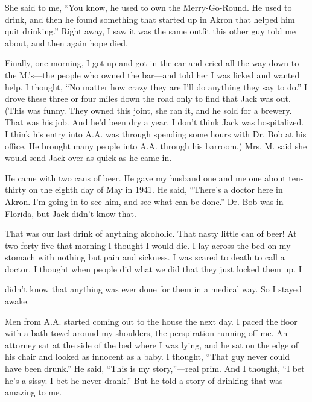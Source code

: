 \begin{biblechapter}
She said to me, “You know, he used to own the Merry-Go-Round. He used to drink, and then he found something that started up in Akron that helped him quit drinking.” Right away, I saw it was the same outfit this other guy told me about, and then again hope died.

Finally, one morning, I got up and got in the car and cried all the way down to the M.’s—the people who owned the bar—and told her I was licked and wanted help. I thought, “No matter how crazy they are I’ll do anything they say to do.” I drove these three or four miles down the road only to find that Jack was out. (This was funny. They owned this joint, she ran it, and he sold for a brewery. That was his job. And he’d been dry a year. I don’t think Jack was hospitalized. I think his entry into A.A. was through spending some hours with Dr. Bob at his office. He brought many people into A.A. through his barroom.) Mrs. M. said she would send Jack over as quick as he came in.

He came with two cans of beer. He gave my husband one and me one about ten-thirty on the eighth day of May in 1941. He said, “There’s a doctor here in Akron. I’m going in to see him, and see what can be done.” Dr. Bob was in Florida, but Jack didn’t know that.

That was our last drink of anything alcoholic. That nasty little can of beer! At two-forty-five that morning I thought I would die. I lay across the bed on my stomach with nothing but pain and sickness. I was scared to death to call a doctor. I thought when people did what we did that they just locked them up. I

didn’t know that anything was ever done for them in a medical way. So I stayed awake.

Men from A.A. started coming out to the house the next day. I paced the floor with a bath towel around my shoulders, the perspiration running off me. An attorney sat at the side of the bed where I was lying, and he sat on the edge of his chair and looked as innocent as a baby. I thought, “That guy never could have been drunk.” He said, “This is my story,”—real prim. And I thought, “I bet he’s a sissy. I bet he never drank.” But he told a story of drinking that was amazing to me.


\end{biblechapter}
